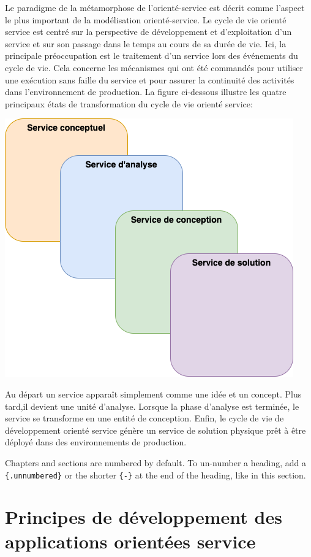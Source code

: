 \documentclass[
]{book}
\theoremstyle{definition}
\theoremstyle{definition}
\theoremstyle{definition}
\theoremstyle{definition}
\theoremstyle{remark}
\begin{document}
Le paradigme de la métamorphose de l'orienté-service est décrit comme l'aspect le plus important de la modélisation orienté-service.
Le cycle de vie orienté service est centré sur la perspective de développement et d'exploitation d'un service et sur son passage dans le temps au cours de sa durée de vie. Ici, la principale préoccupation est le traitement d'un service lors des événements du cycle de vie. Cela concerne les mécanismes qui ont été commandés pour utiliser une exécution sans faille du service et pour assurer la continuité des activités dans l'environnement de production. La figure ci-dessous illustre les quatre principaux états de transformation du cycle de vie orienté service:

\begin{center}\includegraphics[width=0.7\linewidth]{evolutionservice} \end{center}

Au départ un service apparaît simplement comme une idée et un concept. Plus tard,il devient une unité d'analyse. Lorsque la phase d'analyse est terminée, le service se transforme en une entité de conception. Enfin, le cycle de vie de développement orienté service génère un service de solution physique prêt à être déployé dans des environnements de production.

Chapters and sections are numbered by default. To un-number a heading, add a \texttt{\{.unnumbered\}} or the shorter \texttt{\{-\}} at the end of the heading, like in this section.

\hypertarget{principes-de-duxe9veloppement-des-applications-orientuxe9es-service}{%
\chapter{Principes de développement des applications orientées service}\label{principes-de-duxe9veloppement-des-applications-orientuxe9es-service}}
\end{document}
